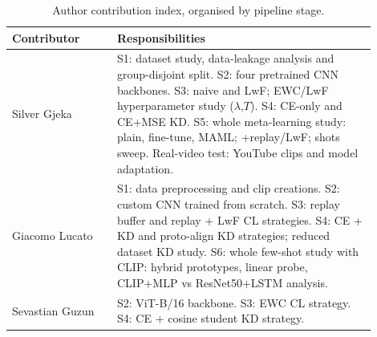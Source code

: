 \documentclass[conference]{IEEEtran}
\begin{document}
\begin{table}[h]
\centering
\caption{Author contribution index, organised by pipeline stage.}
\label{tab:contrib}
\renewcommand{\arraystretch}{1.2}
\begin{tabular}{p{0.26\linewidth}p{0.64\linewidth}}
\toprule
Contributor & Responsibilities \\
\midrule
Silver Gjeka &
S1: dataset study, data-leakage analysis and group-disjoint split.
S2: four pretrained CNN backbones.
S3: naive and LwF; EWC/LwF hyperparameter study ($\lambda$,$T$).
S4: CE-only and CE+MSE KD.
S5: whole meta-learning study: plain, fine-tune, MAML; +replay/LwF; shots sweep.
Real-video test: YouTube clips and model adaptation. \\
Giacomo Lucato &
S1: data preprocessing and clip creations.
S2: custom CNN trained from scratch.
S3: replay buffer and replay + LwF CL strategies.
S4: CE + KD and proto-align KD strategies; reduced dataset KD study.
S6: whole few-shot study with CLIP: hybrid prototypes, linear probe, CLIP+MLP vs ResNet50+LSTM analysis. \\
Sevastian Guzun &
S2: ViT-B/16 backbone.
S3: EWC CL strategy.
S4: CE + cosine student KD strategy. \\
\bottomrule
\end{tabular}
\end{table}
\end{document}
